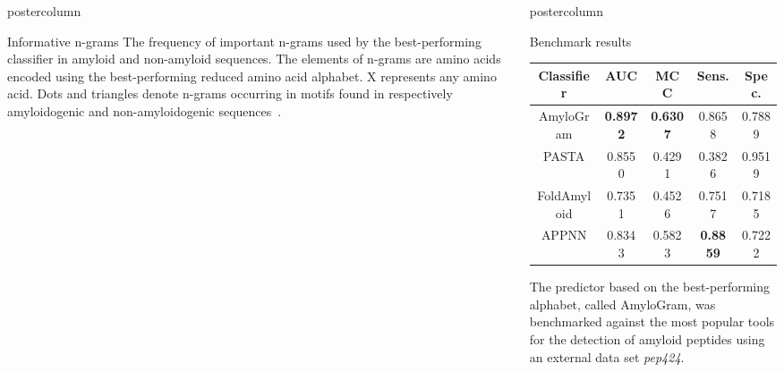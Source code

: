 \documentclass[final]{beamer}\usepackage[]{graphicx}\usepackage[]{color}
\newlength{\columnheight}
\begin{document}
\begin{frame}
\begin{columns}
\begin{column}{.53\textwidth}
\begin{beamercolorbox}[center,wd=\textwidth]{postercolumn}
\begin{minipage}[T]{.95\textwidth}
{\begin{block}{Informative n-grams}
The frequency of important n-grams used by the best-performing 
classifier in amyloid and non-amyloid sequences. The elements of n-grams are 
amino acids encoded using the best-performing reduced amino acid alphabet. 
X represents any amino acid. Dots and triangles 
denote n-grams occurring in motifs found in respectively amyloidogenic and 
non-amyloidogenic sequences~\citep{paz_sequence_2004}.

\end{block}



}
\end{minipage}
\end{beamercolorbox}
\end{column}



\begin{column}{.48\textwidth}
\begin{beamercolorbox}[center,wd=\textwidth]{postercolumn}
\begin{minipage}[T]{.95\textwidth}  
\parbox[t][\columnheight]{\textwidth}
{


\begin{block}{Benchmark results}

\begin{table}[ht]
\centering

\begin{tabular}{ccccc}
  \toprule
Classifier & AUC & MCC & Sens. & Spec. \\ 
  \midrule
AmyloGram & \textbf{0.8972} & \textbf{0.6307} & 0.8658 & 0.7889 \\ 
  \rowcolor{white}PASTA \citep{walsh_pasta_2014} & 0.8550 & 0.4291 & 0.3826 & 0.9519 \\ 
   FoldAmyloid \citep{garbuzynskiy_foldamyloid:_2010} & 0.7351 & 0.4526 & 0.7517 & 0.7185 \\ 
  \rowcolor{white}APPNN \citep{familia_prediction_2015} & 0.8343 & 0.5823 & \textbf{0.8859} & 0.7222 \\ 
   \bottomrule
\end{tabular}
\end{table}

The predictor based on the best-performing alphabet, called AmyloGram, was benchmarked against the most popular tools for the detection of amyloid peptides using an external data set \textit{pep424}.

\end{block}
\vfill


}
\end{minipage}
\end{beamercolorbox}
\end{column}
\end{columns}
\end{frame}
\end{document}
